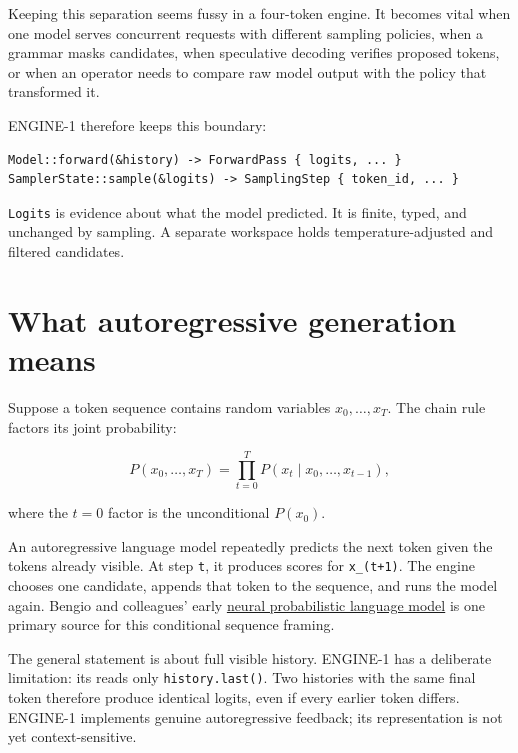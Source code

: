 Keeping this separation seems fussy in a four-token engine. It becomes
vital when one model serves concurrent requests with different sampling
policies, when a grammar masks candidates, when speculative decoding
verifies proposed tokens, or when an operator needs to compare raw model
output with the policy that transformed it.

ENGINE-1 therefore keeps this boundary:

\begin{verbatim}
Model::forward(&history) -> ForwardPass { logits, ... }
SamplerState::sample(&logits) -> SamplingStep { token_id, ... }
\end{verbatim}

\texttt{Logits} is evidence about what the model predicted. It is
finite, typed, and unchanged by sampling. A separate workspace holds
temperature-adjusted and filtered candidates.

\section{What autoregressive generation
means}\label{what-autoregressive-generation-means}

Suppose a token sequence contains random variables \(x_0,\ldots,x_T\).
The chain rule factors its joint probability:

\begin{equation}
P(x_0,\ldots,x_T)
=\prod_{t=0}^{T}P\!\left(x_t\mid x_0,\ldots,x_{t-1}\right),
\end{equation}

where the \(t=0\) factor is the unconditional \(P(x_0)\).

An autoregressive language model repeatedly predicts the next token
given the tokens already visible. At step \texttt{t}, it produces scores
for \texttt{x\_(t+1)}. The engine chooses one candidate, appends that
token to the sequence, and runs the model again. Bengio and colleagues'
early \href{https://jmlr.org/papers/v3/bengio03a.html}{neural
probabilistic language model} is one primary source for this conditional
sequence framing.

The general statement is about full visible history. ENGINE-1 has a
deliberate limitation: its \texttt{} reads
only \texttt{history.last()}. Two histories with the same final token
therefore produce identical logits, even if every earlier token differs.
ENGINE-1 implements genuine autoregressive feedback; its representation
is not yet context-sensitive.

